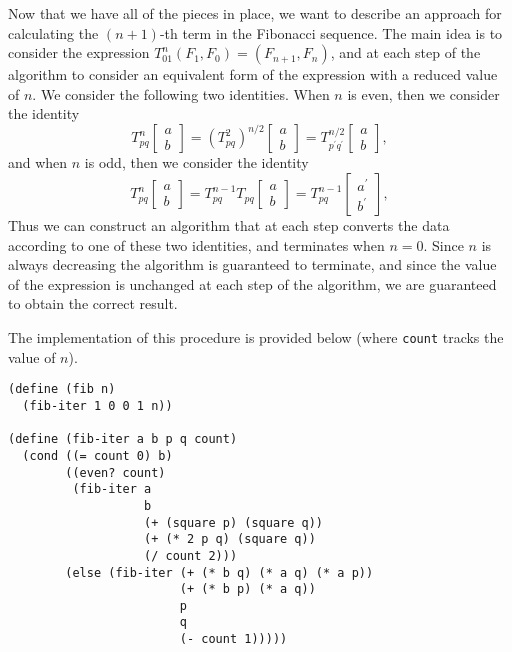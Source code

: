 \documentclass{article}
\begin{document}
Now that we have all of the pieces in place, we want to describe an approach for
calculating the $(n + 1)$-th term in the Fibonacci sequence.  The main idea is
to consider the expression $T_{01}^n(F_1, F_0) = (F_{n + 1}, F_n)$, and at each
step of the algorithm to consider an equivalent form of the expression with a
reduced value of $n$.  We consider the following two identities.  When $n$ is
even, then we consider the identity
\begin{equation*}
  T_{pq}^n
  \begin{bmatrix}
    a \\
    b
  \end{bmatrix}
  = \left(T_{pq}^2\right)^{n / 2}
  \begin{bmatrix}
    a \\
    b
  \end{bmatrix}
  =
  T_{p^{\prime} q^{\prime}}^{n / 2}
  \begin{bmatrix}
    a \\
    b
  \end{bmatrix},
\end{equation*}
and when $n$ is odd, then we consider the identity
\begin{equation*}
  T_{pq}^n
  \begin{bmatrix}
    a \\
    b
  \end{bmatrix}
  = T_{pq}^{n - 1} T_{pq}
  \begin{bmatrix}
    a \\
    b
  \end{bmatrix}
  = T_{pq}^{n - 1}
  \begin{bmatrix}
    a^{\prime} \\
    b^{\prime}
  \end{bmatrix},
\end{equation*}
Thus we can construct an algorithm that at each step converts the data according
to one of these two identities, and terminates when $n = 0$.  Since $n$ is
always decreasing the algorithm is guaranteed to terminate, and since the value
of the expression is unchanged at each step of the algorithm, we are guaranteed
to obtain the correct result.

The implementation of this procedure is provided below (where
\lstinline{count} tracks the value of $n$).

\vspace{5mm}
\begin{lstlisting}[style=scheme]
(define (fib n)
  (fib-iter 1 0 0 1 n))

(define (fib-iter a b p q count)
  (cond ((= count 0) b)
        ((even? count)
         (fib-iter a
                   b
                   (+ (square p) (square q))
                   (+ (* 2 p q) (square q))
                   (/ count 2)))
        (else (fib-iter (+ (* b q) (* a q) (* a p))
                        (+ (* b p) (* a q))
                        p
                        q
                        (- count 1)))))
\end{lstlisting}
\end{document}
